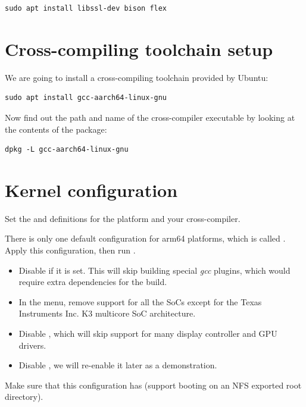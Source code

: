 \begin{verbatim}
sudo apt install libssl-dev bison flex
\end{verbatim}

\section{Cross-compiling toolchain setup}

We are going to install a cross-compiling toolchain provided by Ubuntu:

\begin{verbatim}
sudo apt install gcc-aarch64-linux-gnu
\end{verbatim}

Now find out the path and name of the cross-compiler executable by looking at the contents of the package:

\begin{verbatim}
dpkg -L gcc-aarch64-linux-gnu
\end{verbatim}

\section{Kernel configuration}

Set the  and  definitions for the 
platform and your cross-compiler.

There is only one default configuration for arm64 platforms, which is called
. Apply this configuration, then run .

\begin{itemize}
\item Disable  if it is set. This will skip
  building special {\em gcc} plugins, which would require extra dependencies
  for the build.
\item In the  menu, remove support for all the SoCs except
for the Texas Instruments Inc. K3 multicore SoC architecture.
\item Disable , which will skip support for many display
controller and GPU drivers.
\item Disable , we will re-enable it later as a demonstration.
\end{itemize}

Make sure that this configuration has  (support
booting on an NFS exported root directory).

